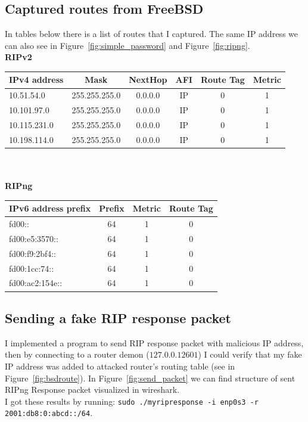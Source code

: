 \documentclass[11pt,a4paper]{article}
\begin{document}
\subsection{Captured routes from FreeBSD}
In tables below there is a list of routes that I captured. The same IP address we can also see in Figure~\ref{fig:simple_password} and Figure~\ref{fig:ripng}.\\

\noindent
\textbf{RIPv2}\\
\begin{tabular}{lccccc}
IPv4 address     & Mask  & NextHop & AFI & Route Tag & Metric\\
\hline
10.51.54.0 		& 255.255.255.0 & 0.0.0.0 & IP & 0 & 1\\
10.101.97.0    & 255.255.255.0 & 0.0.0.0 & IP & 0 & 1\\
10.115.231.0    & 255.255.255.0 & 0.0.0.0 & IP & 0 & 1\\
10.198.114.0    & 255.255.255.0 & 0.0.0.0 & IP & 0 & 1\\
\end{tabular}
\\
\\

\noindent
\textbf{RIPng}\\
\begin{tabular}{lccc}
IPv6 address prefix    & Prefix   & Metric & Route Tag \\
\hline
fd00:: 		& 64  & 1 & 0  \\
fd00:e5:3570:: 		& 64  & 1 & 0  \\
fd00:f9:2bf4::    & 64  & 1 & 0   \\
fd00:1cc:74::    & 64  & 1 & 0   \\
fd00:ac2:154e::    & 64  & 1 & 0   \\
\end{tabular}


\subsection{Sending a fake RIP response packet}
I implemented a program to send RIP response packet with malicious IP address, then by connecting to a router demon ($127.0.0.1 2601$) I could verify that my fake IP address was added to attacked router's routing table (see in Figure~\ref{fig:bsdroute}). In Figure~\ref{fig:send_packet} we can find structure of sent RIPng Response packet visualized in wireshark. \\
\noindent
I got these results by running: \texttt{sudo ./myripresponse -i enp0s3 -r  2001:db8:0:abcd::/64}.
\end{document}
